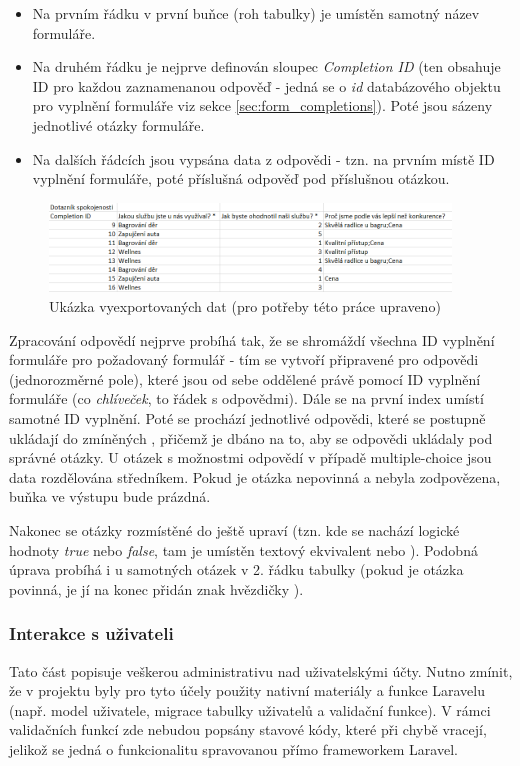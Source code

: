 			\begin{itemize}
				\item Na prvním řádku v první buňce (roh tabulky) je umístěn samotný název formuláře.
				\item Na druhém řádku je nejprve definován sloupec \textit{Completion ID} (ten obsahuje ID pro každou zaznamenanou odpověď - jedná se o \textit{id} databázového objektu pro vyplnění formuláře viz sekce \ref{sec:form_completions}). Poté jsou sázeny jednotlivé otázky formuláře.
				\item Na dalších řádcích jsou vypsána data z odpovědi - tzn. na prvním místě ID vyplnění formuláře, poté příslušná odpověď pod příslušnou otázkou.
			\end{itemize}
		
			\begin{figure}[h]
				\centering
				\includegraphics[width=0.95\textwidth]{img/export_excel.png}
				\caption{Ukázka vyexportovaných dat (pro potřeby této práce upraveno)}
				\label{fig:export_excel}
			\end{figure}
		
			Zpracování odpovědí nejprve probíhá tak, že se shromáždí všechna ID vyplnění formuláře pro požadovaný formulář - tím se vytvoří připravené  pro odpovědi (jednorozměrné pole), které jsou od sebe oddělené právě pomocí ID vyplnění formuláře (co \textit{chlíveček}, to řádek s odpovědmi). Dále se na první index  umístí samotné ID vyplnění. Poté se prochází jednotlivé odpovědi, které se postupně ukládají do zmíněných , přičemž je dbáno na to, aby se odpovědi ukládaly pod správné otázky. U otázek s možnostmi odpovědí v případě multiple-choice jsou data rozdělována středníkem. Pokud je otázka nepovinná a nebyla zodpovězena, buňka ve výstupu bude prázdná. 
			
			Nakonec se otázky rozmístěné do  ještě upraví (tzn. kde se nachází logické hodnoty \textit{true} nebo \textit{false}, tam je umístěn textový ekvivalent  nebo ). Podobná úprava probíhá i u samotných otázek v 2. řádku tabulky (pokud je otázka povinná, je jí na konec přidán znak hvězdičky \uv{*}).
			
		\subsubsection{Interakce s uživateli}
		Tato část popisuje veškerou administrativu nad uživatelskými účty. Nutno zmínit, že v projektu byly pro tyto účely použity nativní materiály a funkce Laravelu (např. model uživatele, migrace tabulky uživatelů a validační funkce). V rámci validačních funkcí zde nebudou popsány stavové kódy, které při chybě vracejí, jelikož se jedná o funkcionalitu spravovanou přímo frameworkem Laravel.
		
